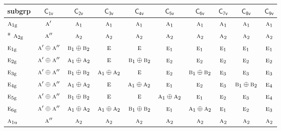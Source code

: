 \documentclass[10pt,a4paper]{article}
\numberwithin{equation}{section}
\newcommand{\grp}[1]{\mathsf{#1}}
\newcommand{\irr}[1]{\text{\normalfont\scshape #1}}
\newcommand{\ptag}[1]{\mathrm{#1}}
\begin{document}
{\small\begin{longtable}{@{}lccccccccc@{}}\toprule
subgrp & \href{C1v.pdf}{$\grp{C_{1v}}$} & \href{C2v.pdf}{$\grp{C_{2v}}$} & \href{C3v.pdf}{$\grp{C_{3v}}$} & \href{C4v.pdf}{$\grp{C_{4v}}$} & \href{C5v.pdf}{$\grp{C_{5v}}$} & \href{C6v.pdf}{$\grp{C_{6v}}$} & \href{C7v.pdf}{$\grp{C_{7v}}$} & \href{C8v.pdf}{$\grp{C_{8v}}$} & \href{C9v.pdf}{$\grp{C_{9v}}$}\\\midrule\endhead
\bottomrule\endfoot\endlastfoot
$\irr{a}_{1\ptag{g}}$ & $\irr{a}'$ & $\irr{a}_{1}$ & $\irr{a}_{1}$ & $\irr{a}_{1}$ & $\irr{a}_{1}$ & $\irr{a}_{1}$ & $\irr{a}_{1}$ & $\irr{a}_{1}$ & $\irr{a}_{1}$\\*
$\irr{a}_{2\ptag{g}}$ & $\irr{a}''$ & $\irr{a}_{2}$ & $\irr{a}_{2}$ & $\irr{a}_{2}$ & $\irr{a}_{2}$ & $\irr{a}_{2}$ & $\irr{a}_{2}$ & $\irr{a}_{2}$ & $\irr{a}_{2}$\\
$\irr{e}_{1\ptag{g}}$ & $\irr{a}'\oplus \irr{a}''$ & $\irr{b}_{1}\oplus \irr{b}_{2}$ & $\irr{e}$ & $\irr{e}$ & $\irr{e}_{1}$ & $\irr{e}_{1}$ & $\irr{e}_{1}$ & $\irr{e}_{1}$ & $\irr{e}_{1}$\\
$\irr{e}_{2\ptag{g}}$ & $\irr{a}'\oplus \irr{a}''$ & $\irr{a}_{1}\oplus \irr{a}_{2}$ & $\irr{e}$ & $\irr{b}_{1}\oplus \irr{b}_{2}$ & $\irr{e}_{2}$ & $\irr{e}_{2}$ & $\irr{e}_{2}$ & $\irr{e}_{2}$ & $\irr{e}_{2}$\\
$\irr{e}_{3\ptag{g}}$ & $\irr{a}'\oplus \irr{a}''$ & $\irr{b}_{1}\oplus \irr{b}_{2}$ & $\irr{a}_{1}\oplus \irr{a}_{2}$ & $\irr{e}$ & $\irr{e}_{2}$ & $\irr{b}_{1}\oplus \irr{b}_{2}$ & $\irr{e}_{3}$ & $\irr{e}_{3}$ & $\irr{e}_{3}$\\
$\irr{e}_{4\ptag{g}}$ & $\irr{a}'\oplus \irr{a}''$ & $\irr{a}_{1}\oplus \irr{a}_{2}$ & $\irr{e}$ & $\irr{a}_{1}\oplus \irr{a}_{2}$ & $\irr{e}_{1}$ & $\irr{e}_{2}$ & $\irr{e}_{3}$ & $\irr{b}_{1}\oplus \irr{b}_{2}$ & $\irr{e}_{4}$\\
$\irr{e}_{5\ptag{g}}$ & $\irr{a}'\oplus \irr{a}''$ & $\irr{b}_{1}\oplus \irr{b}_{2}$ & $\irr{e}$ & $\irr{e}$ & $\irr{a}_{1}\oplus \irr{a}_{2}$ & $\irr{e}_{1}$ & $\irr{e}_{2}$ & $\irr{e}_{3}$ & $\irr{e}_{4}$\\
$\irr{e}_{6\ptag{g}}$ & $\irr{a}'\oplus \irr{a}''$ & $\irr{a}_{1}\oplus \irr{a}_{2}$ & $\irr{a}_{1}\oplus \irr{a}_{2}$ & $\irr{b}_{1}\oplus \irr{b}_{2}$ & $\irr{e}_{1}$ & $\irr{a}_{1}\oplus \irr{a}_{2}$ & $\irr{e}_{1}$ & $\irr{e}_{2}$ & $\irr{e}_{3}$\\
$\irr{a}_{1\ptag{u}}$ & $\irr{a}''$ & $\irr{a}_{2}$ & $\irr{a}_{2}$ & $\irr{a}_{2}$ & $\irr{a}_{2}$ & $\irr{a}_{2}$ & $\irr{a}_{2}$ & $\irr{a}_{2}$ & $\irr{a}_{2}$\\

\end{longtable}}
\end{document}
